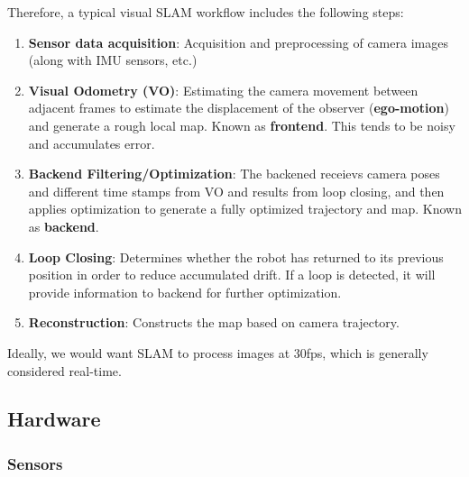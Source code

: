 \documentclass{article}
\theoremstyle{definition}
\theoremstyle{remark}
\theoremstyle{definition}
\begin{document}
Therefore, a typical visual SLAM workflow includes the following steps: 
\begin{enumerate}
    \item \textbf{Sensor data acquisition}: Acquisition and preprocessing of camera images (along with IMU sensors, etc.) 
    \item \textbf{Visual Odometry (VO)}: Estimating the camera movement between adjacent frames to estimate the displacement of the observer (\textbf{ego-motion}) and generate a rough local map. Known as \textbf{frontend}. This tends to be noisy and accumulates error. 
    \item \textbf{Backend Filtering/Optimization}: The backened receievs camera poses and different time stamps from VO and results from loop closing, and then applies optimization to generate a fully optimized trajectory and map. Known as \textbf{backend}. 
    \item \textbf{Loop Closing}: Determines whether the robot has returned to its previous position in order to reduce accumulated drift. If a loop is detected, it will provide information to backend for further optimization. 
    \item \textbf{Reconstruction}: Constructs the map based on camera trajectory. 
\end{enumerate}
Ideally, we would want SLAM to process images at 30fps, which is generally considered real-time. 

\subsection{Hardware}

\subsubsection{Sensors}
\end{document}
